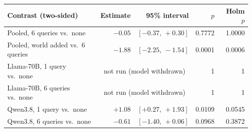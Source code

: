 \begin{tabular}{lrrrr}
\toprule
Contrast (two-sided) & Estimate & 95\% interval & $p$ & Holm $p$ \\
\midrule
Pooled, 6 queries vs.\ none & $-0.05$ & $[-0.37,\ +0.30]$ & 0.7772 & 1.0000 \\
Pooled, world added vs.\ 6 queries & $-1.88$ & $[-2.25,\ -1.54]$ & 0.0001 & 0.0006 \\
Llama-70B, 1 query vs.\ none & \multicolumn{2}{c}{not run (model withdrawn)} & 1 & 1 \\
Llama-70B, 6 queries vs.\ none & \multicolumn{2}{c}{not run (model withdrawn)} & 1 & 1 \\
Qwen3.8, 1 query vs.\ none & $+1.08$ & $[+0.27,\ +1.93]$ & 0.0109 & 0.0545 \\
Qwen3.8, 6 queries vs.\ none & $-0.61$ & $[-1.40,\ +0.06]$ & 0.0968 & 0.3872 \\
\bottomrule
\end{tabular}
